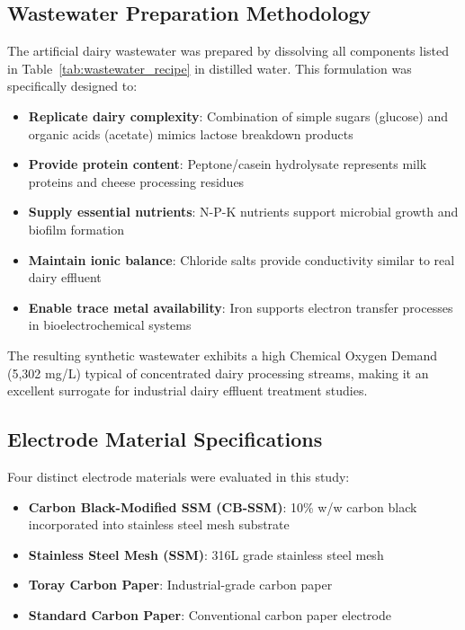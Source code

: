 \documentclass[12pt,a4paper]{article}
\begin{document}
\subsection{Wastewater Preparation Methodology}

The artificial dairy wastewater was prepared by dissolving all components listed in Table~\ref{tab:wastewater_recipe} in distilled water. This formulation was specifically designed to:

\begin{itemize}
    \item \textbf{Replicate dairy complexity}: Combination of simple sugars (glucose) and organic acids (acetate) mimics lactose breakdown products
    \item \textbf{Provide protein content}: Peptone/casein hydrolysate represents milk proteins and cheese processing residues
    \item \textbf{Supply essential nutrients}: N-P-K nutrients support microbial growth and biofilm formation
    \item \textbf{Maintain ionic balance}: Chloride salts provide conductivity similar to real dairy effluent
    \item \textbf{Enable trace metal availability}: Iron supports electron transfer processes in bioelectrochemical systems
\end{itemize}

The resulting synthetic wastewater exhibits a high Chemical Oxygen Demand (5,302 mg/L) typical of concentrated dairy processing streams, making it an excellent surrogate for industrial dairy effluent treatment studies.

\subsection{Electrode Material Specifications}

Four distinct electrode materials were evaluated in this study:

\begin{itemize}
    \item \textbf{Carbon Black-Modified SSM (CB-SSM)}: 10\% w/w carbon black incorporated into stainless steel mesh substrate
    \item \textbf{Stainless Steel Mesh (SSM)}: 316L grade stainless steel mesh
    \item \textbf{Toray Carbon Paper}: Industrial-grade carbon paper
    \item \textbf{Standard Carbon Paper}: Conventional carbon paper electrode
\end{itemize}
\end{document}
